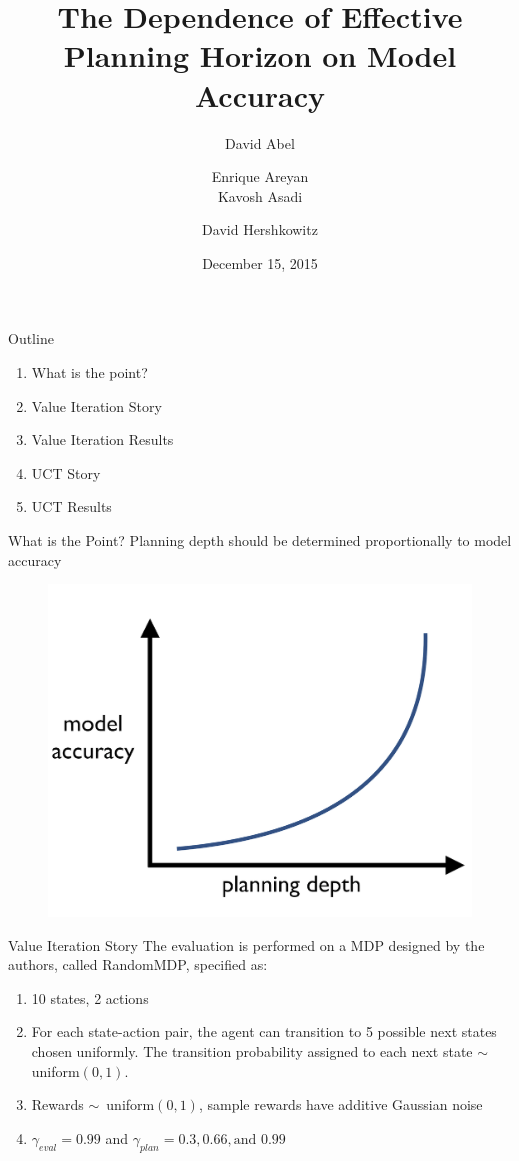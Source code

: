 \documentclass{beamer}
\title[The Dependence of Planning Horizon on Model Accuracy]{The Dependence of Effective Planning Horizon on Model Accuracy}
\author[]{David Abel  \and Enrique Areyan \\ Kavosh Asadi  \and David Hershkowitz}
\date{December 15, 2015}
\begin{document}
\begin{frame}
\titlepage
\end{frame}

\begin{frame}{Outline}
\begin{enumerate}
	\item What is the point?
	\item Value Iteration Story
	\item Value Iteration Results
	\item UCT Story
	\item UCT Results
\end{enumerate}
\end{frame}

\begin{frame}{What is the Point?}
\centering
Planning depth should be determined proportionally to model accuracy
\begin{figure}
\includegraphics[page=1,width=.5\textwidth]{WhatIsThePoint.png}
\end{figure}
\end{frame}


\begin{frame}{Value Iteration Story}
The evaluation is performed on a MDP designed by the authors, called RandomMDP, specified as:\vspace{8mm}
\begin{enumerate}
\setlength\itemsep{1em}
\item 10 states, 2 actions 
\item For each state-action pair, the agent can transition to 5 possible next states chosen uniformly.
The transition probability assigned to each next state  $\sim$ uniform$(0,1)$. 
\item Rewards \mbox{$\sim$ uniform$(0,1)$}, sample rewards have additive Gaussian noise
\item $\gamma_{eval} = 0.99$ and $\gamma_{plan} = 0.3,0.66, \text{and } 0.99$
\end{enumerate}

\end{frame}
\end{document}
